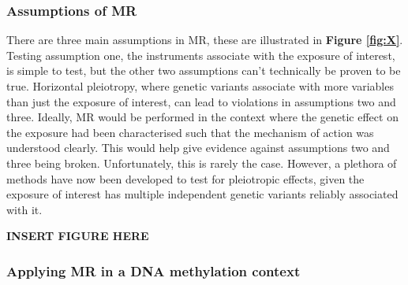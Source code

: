 \documentclass[11pt,twoside]{bristolthesis}
\begin{document}
\hypertarget{assumptions-of-mr}{%
\subsubsection{Assumptions of MR}\label{assumptions-of-mr}}

There are three main assumptions in MR, these are illustrated in \textbf{Figure \ref{fig:X}}. Testing assumption one, the instruments associate with the exposure of interest, is simple to test, but the other two assumptions can't technically be proven to be true. Horizontal pleiotropy, where genetic variants associate with more variables than just the exposure of interest, can lead to violations in assumptions two and three. Ideally, MR would be performed in the context where the genetic effect on the exposure had been characterised such that the mechanism of action was understood clearly. This would help give evidence against assumptions two and three being broken. Unfortunately, this is rarely the case. However, a plethora of methods have now been developed to test for pleiotropic effects, given the exposure of interest has multiple independent genetic variants reliably associated with it.

\textbf{INSERT FIGURE HERE}

\hypertarget{applying-mr-in-a-dna-methylation-context}{%
\subsubsection{Applying MR in a DNA methylation context}\label{applying-mr-in-a-dna-methylation-context}}
\end{document}
